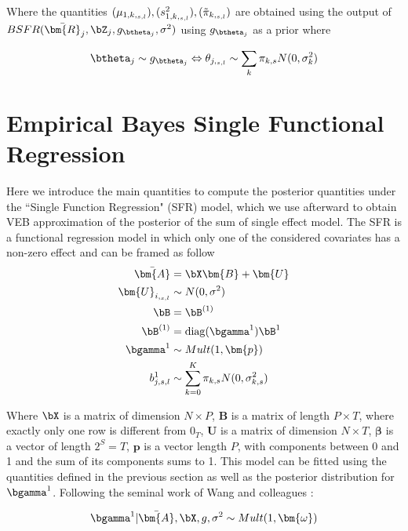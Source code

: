 Where the quantities $(\mu_{1,k,_{s,l}}),(s^2_{1,k,_{s,l}}),(\Tilde{\pi}_{k, _{s,l}}) $ are obtained  using the output of $BSFR(\bar{\bm{R}}_j, \bZ_j,g_{\btheta_j},\sigma^2) $ using    $g_{\btheta_j}$    as a prior where 

\begin{align}
    \btheta_j \sim  g_{\btheta_j}   \Leftrightarrow   \theta_{j,_{s,l}} \sim  \sum_k \pi_{k,s}N(0,\sigma^2_k)
\end{align}


\section{Empirical Bayes  Single Functional Regression}

Here we introduce the main quantities to compute the posterior quantities under the  ``Single Function Regression" (SFR) model, which we use afterward to obtain VEB approximation of the posterior of the sum of single effect model. The SFR is a functional regression model in which only one of the considered covariates has a non-zero effect and can be framed as follow
 \begin{align}\label{eq:SFR}
    \bar{\bm{A}} &= \bX\bm{B}+\bm{U}\\
        \bm{U}_{i,_{s,l}} &\sim N(0,\sigma^2)\\
     \bB & = \bB^{(1)}\\
     \bB^{(1)}&=\operatorname{diag}(\bgamma ^1)\bB ^1 \\
 \bgamma ^1 & \sim Mult(1, \bm{p})\\
    b^1_{j,s,l} &\sim  \sum_{k=0}^{K} \pi_{k,s} N(0,\sigma_{k,s}^2)
\end{align}


 


Where  $ \bX$ is a matrix of dimension $N\times P $, $\bm{B}$ is a matrix of length $P\times T$, where exactly only one row is different from $0_T$, $\bm{U}$ is a matrix of dimension $N\times T$, $ \bm{\beta}$ is a vector of length $2^S = T$, $\bm{p}$ is a vector length $P$, with components between 0 and 1 and the sum of its components sums to 1. This model can be fitted using the quantities defined in the previous section as well as the posterior distribution for $ \bgamma ^1  $. Following the seminal work of Wang and colleagues \citep{wang_simple_2020}:
 

\begin{align}
  \bgamma ^1|\bar{\bm{A}},  \bX, g, \sigma^2 \sim Mult(1, \bm{\omega})
\end{align}
 

